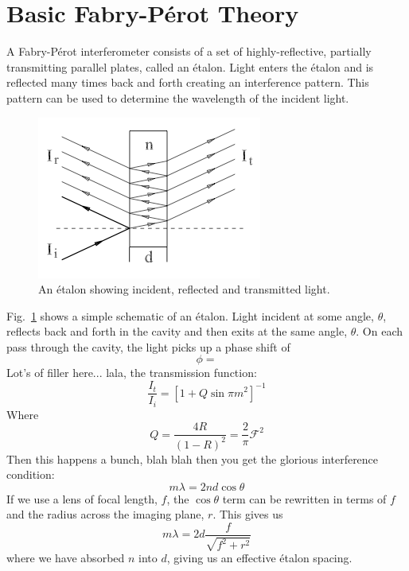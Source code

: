 \documentclass{article}
\begin{document}

\section{Basic Fabry-P\'{e}rot Theory}
A Fabry-P\'{e}rot interferometer consists of a set of highly-reflective, partially transmitting parallel plates, called an \'{e}talon. Light enters the \'{e}talon and is reflected many times back and forth creating an interference pattern. This pattern can be used to determine the wavelength of the incident light. 
\begin{figure}
\includegraphics[width=\textwidth]{Images/etalon.png}
\caption{An \'{e}talon showing incident, reflected and transmitted light.
\label{fig:etalon}}
\end{figure}
Fig.~\ref{fig:etalon} shows a simple schematic of an \'{e}talon. Light incident at some angle, $\theta$, reflects back and forth in the cavity and then exits at the same angle, $\theta$. On each pass through the cavity, the light picks up a phase shift of
\begin{equation}
\phi = 
\end{equation}
Lot's of filler here... lala, the transmission function:
\begin{equation}
\frac{I_{t}}{I_{i}} = \left[1+Q\sin{\pi m}^{2}\right]^{-1}
\label{eq:airy}
\end{equation}
Where
\begin{equation}
Q = \frac{4R}{(1-R)^{2}} = \frac{2}{\pi}\mathcal{F}^{2}
\end{equation}
Then this happens a bunch, blah blah then you get the glorious interference condition:
\begin{equation}
m\lambda = 2nd\cos{\theta}
\end{equation}
If we use a lens of focal length, $f$, the $\cos{\theta}$ term can be rewritten in terms of $f$ and the radius across the imaging plane, $r$. This gives us
\begin{equation}
m\lambda = 2d \frac{f}{\sqrt{f^{2}+r^{2}}}
\label{eq:inf_con}
\end{equation}
where we have absorbed $n$ into $d$, giving us an effective \'{e}talon spacing.
\end{document}
